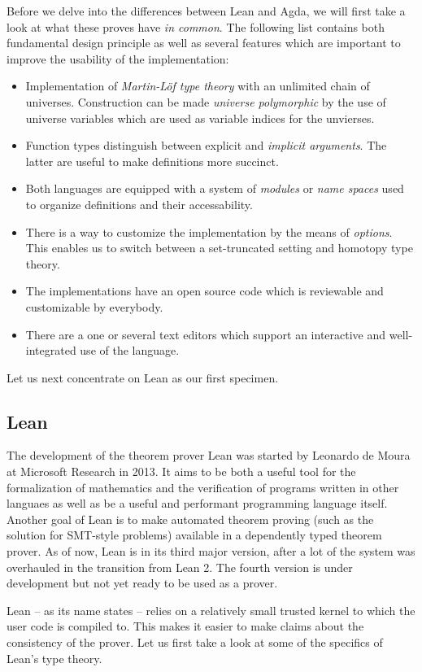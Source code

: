 Before we delve into the differences between Lean and Agda, we will first
take a look at what these proves have \emph{in common}.
The following list contains both fundamental design principle as well as
several features which are important to improve the usability of the
implementation:
\begin{itemize}
\item Implementation of \emph{Martin-Löf type theory} with an unlimited chain of universes.
Construction can be made \emph{universe polymorphic} by the use of
universe variables which are used as variable indices for the unvierses.
\item Function types distinguish between explicit and \emph{implicit arguments}.
The latter are useful to make definitions more succinct.
\item Both languages are equipped with a system of \emph{modules} or \emph{name spaces}
used to organize definitions and their accessability.
\item There is a way to customize the implementation by the means of \emph{options}.
This enables us to switch between a set-truncated setting and
homotopy type theory.
\item The implementations have an open source code which is reviewable and
customizable by everybody.
\item There are a one or several text editors which support an interactive
and well-integrated use of the language.
\end{itemize}

Let us next concentrate on Lean as our first specimen.

\subsection{Lean}

The development of the theorem prover Lean was started by
Leonardo de Moura at Microsoft Research in 2013.
It aims to be both a useful tool for the formalization of mathematics and
the verification of programs written in other languaes as well as
be a useful and performant programming language itself.
Another goal of Lean is to make automated theorem proving (such as the solution
for SMT-style problems) available in a dependently typed theorem prover.
As of now, Lean is in its third major version, after a lot of the system was
overhauled in the transition from Lean 2.
The fourth version is under development but not yet ready to be used as a prover.

Lean -- as its name states -- relies on a relatively small trusted kernel to which
the user code is compiled to.
This makes it easier to make claims about the consistency of the prover.
Let us first take a look at some of the specifics of Lean's type theory.

